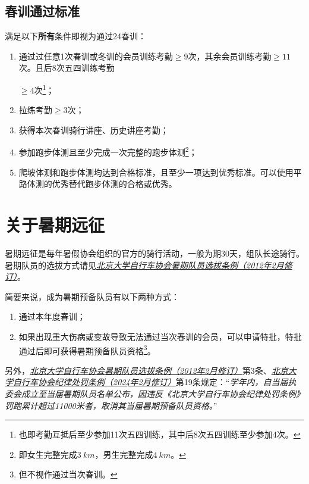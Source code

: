 \documentclass[UTF8]{ctexart}
\begin{document}
\subsection{春训通过标准}

满足以下\textbf{所有}条件即视为通过24春训：
\begin{enumerate}[nosep,left=4em]
    \item 通过过任意1次春训或冬训的会员训练考勤$\ge 9$次，其余会员训练考勤$\ge 11$次。且后8次五四训练考勤
    
    $\ge 4$次\footnote{也即考勤互抵后至少参加11次五四训练，其中后8次五四训练至少参加4次。}；
    \item 拉练考勤$\ge 3$次；
    \item 获得本次春训骑行讲座、历史讲座考勤；
    \item 参加跑步体测且至少完成一次完整的跑步体测\footnote{即女生完整完成$\SI{3}{km}$，男生完整完成$\SI{4}{km}$。}；
    \item 爬坡体测和跑步体测均达到合格标准，且至少一项达到优秀标准。可以使用平路体测的优秀替代跑步体测的合格或优秀。
\end{enumerate}

\section{关于暑期远征}

暑期远征是每年暑假协会组织的官方的骑行活动，一般为期30天，组队长途骑行。暑期队员的选拔方式请见\href{https://chexie.net/bbs/content/?bid=1&tid=9610&p=1}{\textit{北京大学自行车协会暑期队员选拔条例（2012年2月修订）}}。

简要来说，成为暑期预备队员有以下两种方式：
\begin{enumerate}[nosep,left=4em]
    \item 通过本年度春训；
    \item 如果出现重大伤病或变故导致无法通过当次春训的会员，可以申请特批，特批通过后即可获得暑期预备队员资格\footnote{但不视作通过当次春训。}。
\end{enumerate}

另外，\href{https://chexie.net/bbs/content/?bid=1&tid=9610&p=1}{\textit{北京大学自行车协会暑期队员选拔条例（2012年2月修订）}}第3条、\href{https://chexie.net/bbs/content/?bid=1&tid=9751&p=1}{\textit{北京大学自行车协会纪律处罚条例（2024年2月修订）}}第19条规定：“\textit{学年内，自当届执委会成立至当届暑期队员名单公布，因违反《北京大学自行车协会纪律处罚条例》罚跑累计超过11000米者，取消其当届暑期预备队员资格。}”

\end{document}
